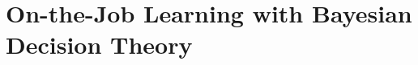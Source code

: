 
\chapter[On-the-Job Learning]{\label{chap:otj} On-the-Job Learning with Bayesian Decision Theory}
\usetikzlibrary{positioning}



%
%



%

%
%



